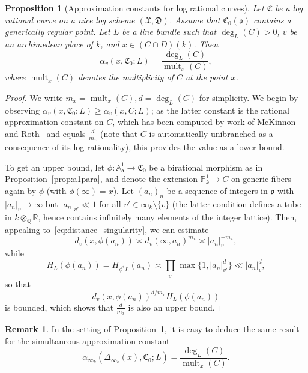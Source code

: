 \documentclass[a4paper, twoside, 11pt]{amsart}
\newtheorem{proposition}[theorem]{Proposition}
\theoremstyle{definition}
\newtheorem{remark}[theorem]{Remark}
\newcommand{\mC}{\mathfrak{C}}
\newcommand{\mD}{\mathfrak{D}}
\newcommand{\mX}{\mathfrak{X}}
\newcommand{\fo}{\mathfrak{o}}
\newcommand{\dA}{\mathbb{A}}
\newcommand{\PP}{\mathbb{P}}
\newcommand{\QQ}{\mathbb{Q}}
\newcommand{\RR}{\mathbb{R}}
\DeclareMathOperator{\mult}{mult}
\begin{document}
\begin{proposition}[Approximation constants for log rational curves]\label{prop:approximation-log-rational}
    Let $\mC$ be a log rational curve on a nice log scheme $(\mX, \mD)$. Assume that $\mC_0(\fo)$ contains a generically regular point. Let $L$ be a line bundle such that $\deg_L(C)> 0$, $v$ be an archimedean place of $k$, and $x\in (C\cap D)(k)$. Then
	\begin{equation*}
		\alpha_v(x, \mC_0; L) = \frac{\deg_{L}(C)}{\mult_x(C)},
	\end{equation*}
    where $\mult_x(C)$ denotes the multiplicity of $C$ at the point $x$.
\end{proposition}
\begin{proof}
	We write $m_x=\mult_x(C),d = \deg_L(C)$ for simplicity. We begin by observing $\alpha_v(x,\mC_0;L)\ge \alpha_v(x,C;L)$; as the latter constant is the rational approximation constant on $C$, which has been computed by work of McKinnon and Roth~\cite[Thm.~2.16]{McK-Roth} and equals $\frac{d}{m_x}$ (note that $C$ is automatically unibranched as a consequence of its log rationality), this provides the value as a lower bound.

    To get an upper bound, let $\phi\colon\dA^1_{\fo}\to\mC_0$ be a birational morphism as in Proposition~\ref{prop:a1para}, and denote the extension $\PP^1_k\to C$ on generic fibers again by $\phi$ (with $\phi(\infty)=x$).  
    Let $(a_n)_n$ be a sequence of integers in $\fo$ with $|a_n|_v\to \infty$ but $|a_n|_{v'} \ll 1$ for all $v'\in \infty_k\setminus \{v\}$ (the latter condition defines a tube in $k\otimes_\QQ \RR$, hence contains infinitely many elements of the integer lattice).  Then, appealing to~\eqref{eq:distance_singularity}, we can estimate
	\begin{equation*}
		d_v(x, \phi(a_n)) \asymp d_v(\infty,a_n)^{m_x} \asymp |a_n|_v^{-m_x},
	\end{equation*}
	while
	\begin{equation*}
		H_L(\phi(a_n)) = H_{\phi^*L}(a_n) \asymp \prod_{v'} \max\{1,|a_n|_{v'}^d\} \ll |a_n|_{v}^{d},
	\end{equation*}
	so that
	\begin{equation*}
		d_v(x,\phi(a_n))^{d/m_x} H_L(\phi(a_n))
	\end{equation*}
	is bounded, which shows that $\frac{d}{m_x}$ is also an upper bound.
\end{proof}

	\begin{remark}
        In the setting of Proposition~\ref{prop:approximation-log-rational}, it is easy to deduce the same result for the simultaneous approximation constant $$\alpha_{\infty_k}(\Delta_{\infty_k}(x),\mC_0;L)=\frac{\deg_{L}(C)}{\mult_x(C)}.$$
	\end{remark}
\end{document}
